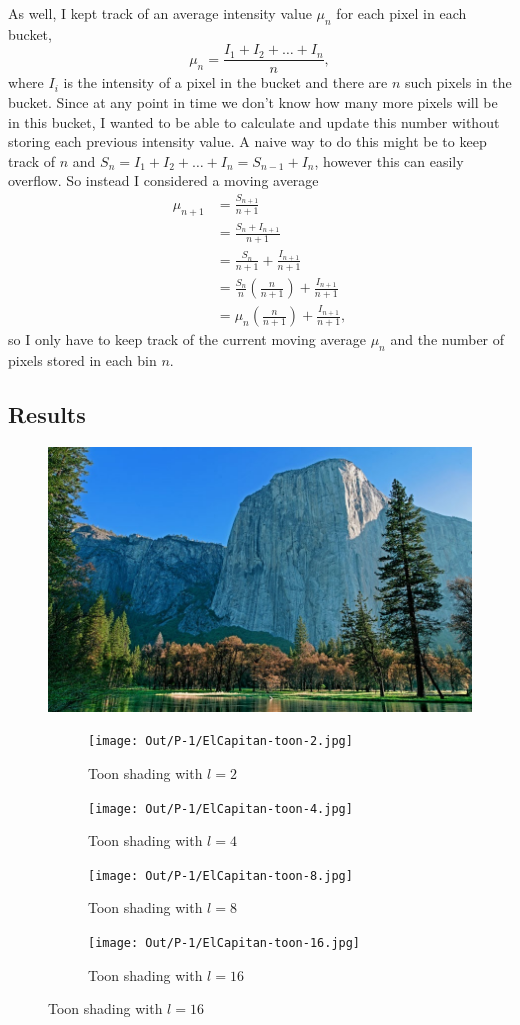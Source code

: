 \documentclass[dvipsnames]{article}
\begin{document}
As well, I kept track of an average intensity value $\mu_n$ for each pixel in each bucket,
\begin{equation}
	\mu_n = \frac{I_1 + I_2 + \dots + I_n}{n},
\end{equation}
where $I_i$ is the intensity of a pixel in the bucket and there are $n$ such pixels in the bucket. Since at any point in time we don't know how many more pixels will be in this bucket, I wanted to be able to calculate and update this number without storing each previous intensity value. A naive way to do this might be to keep track of $n$ and $S_n = I_1 + I_2 + \dots + I_n = S_{n-1} + I_n$, however this can easily overflow. So instead I considered a moving average
\begin{align}
	\mu_{n+1} &= \frac{S_{n+1}}{n + 1} \nonumber\\
	          &= \frac{S_n + I_{n+1}}{n + 1} \nonumber\\
	          &= \frac{S_n}{n+1} + \frac{I_{n+1}}{n+1} \nonumber\\
	          &= \frac{S_n}{n}\left(\frac{n}{n+1}\right) + \frac{I_{n+1}}{n+1} \nonumber\\
	          &= \mu_n\left(\frac{n}{n+1}\right) + \frac{I_{n+1}}{n+1},
\end{align}
so I only have to keep track of the current moving average $\mu_n$ and the number of pixels stored in each bin $n$.

\subsection*{Results}
\begin{figure}[H]
	\centering\includegraphics[width=.5\linewidth]{Images/P-1/ElCapitan.jpg}
	\caption{Original ElCapitan.jpg}

	\begin{subfigure}{.33\linewidth}
		\centering\texttt{[image: Out/P-1/ElCapitan-toon-2.jpg]}
		\caption{Toon shading with $l = 2$}
	\end{subfigure}
	\begin{subfigure}{.33\linewidth}
		\centering\texttt{[image: Out/P-1/ElCapitan-toon-4.jpg]}
		\caption{Toon shading with $l = 4$}
	\end{subfigure}
	\begin{subfigure}{.33\linewidth}
		\centering\texttt{[image: Out/P-1/ElCapitan-toon-8.jpg]}
		\caption{Toon shading with $l = 8$}
	\end{subfigure}
	\begin{subfigure}{.33\linewidth}
		\centering\texttt{[image: Out/P-1/ElCapitan-toon-16.jpg]}
		\caption{Toon shading with $l = 16$}
	\end{subfigure}
\end{figure}
\end{document}
